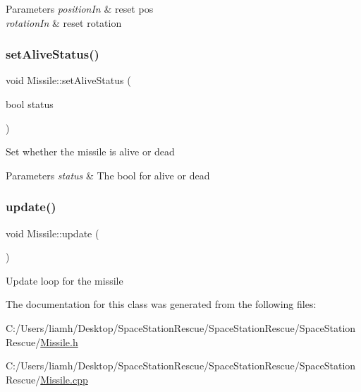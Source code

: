 \begin{DoxyParams}{Parameters}
{\em position\+In} & reset pos\\
\hline
{\em rotation\+In} & reset rotation\\
\hline
\end{DoxyParams}
\mbox{\label{class_missile_ad2b1a2c22fa692e1e91a52fec411704e}} 
\subsubsection{\texorpdfstring{setAliveStatus()}{setAliveStatus()}}
{\footnotesize\ttfamily void Missile\+::set\+Alive\+Status (\begin{DoxyParamCaption}\item[{bool}]{status }\end{DoxyParamCaption})}



Set whether the missile is alive or dead 


\begin{DoxyParams}{Parameters}
{\em status} & The bool for alive or dead\\
\hline
\end{DoxyParams}
\mbox{\label{class_missile_a2ef82438ddc6320bbdfb05227fed047b}} 
\subsubsection{\texorpdfstring{update()}{update()}}
{\footnotesize\ttfamily void Missile\+::update (\begin{DoxyParamCaption}{ }\end{DoxyParamCaption})}



Update loop for the missile 



The documentation for this class was generated from the following files\+:\begin{DoxyCompactItemize}
\item 
C\+:/\+Users/liamh/\+Desktop/\+Space\+Station\+Rescue/\+Space\+Station\+Rescue/\+Space\+Station\+Rescue/\mbox{\hyperlink{_missile_8h}{Missile.\+h}}\item 
C\+:/\+Users/liamh/\+Desktop/\+Space\+Station\+Rescue/\+Space\+Station\+Rescue/\+Space\+Station\+Rescue/\mbox{\hyperlink{_missile_8cpp}{Missile.\+cpp}}\end{DoxyCompactItemize}
